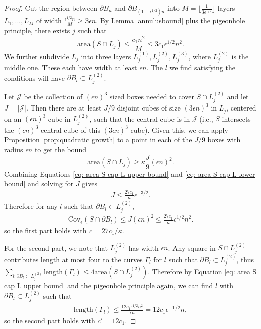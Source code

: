 \documentclass[11pt]{article}
\theoremstyle{remark}
\theoremstyle{definition}
\newcommand{\mc}[1]{\mathcal{#1}}
\begin{document}
\begin{proof}
    Cut the region between $\partial B_n$ and $\partial B_{(1-\epsilon^{1/2})n}$ into $M = \lfloor \frac{1}{3\epsilon^{1/2}}\rfloor$ layers $L_1,...,L_M$ of width $\frac{\epsilon^{1/2} n}{M}\geq 3\epsilon n$. By Lemma \ref{annulusbound} plus the pigeonhole principle, there exists $j$ such that 
    \begin{equation}\label{eq: area S cap L upper bound}
        \text{area}(S\cap L_j) \leq \frac{c_1 n^2}{M} \leq 3 c_1 \epsilon^{1/2} n^2.
    \end{equation}
    We further subdivide $L_j$ into three layers $L_j^{(1)},L_j^{(2)}, L_j^{(3)}$, where $L_j^{(2)}$ is the middle one. These each have width at least $\epsilon n$. The $l$ we find satisfying the conditions will have $\partial B_l \subset L_j^{(2)}$. 

    Let $\mc J$ be the collection of $(\epsilon n)^3$ sized boxes needed to cover $S\cap L_j^{(2)}$ and let $J = |\mc J|$. Then there are at least $J/9$ disjoint cubes of size $(3\epsilon n)^3$ in $L_j$, centered on an $(\epsilon n)^3$ cube in $L_j^{(2)}$, such that the central cube is in $\mc J$ (i.e., $S$ intersects the $(\epsilon n)^3$ central cube of this $(3\epsilon n)^3$ cube). Given this, we can apply Proposition \ref{prop:quadratic growth} to a point in each of the $J/9$ boxes with radius $\epsilon n$ to get the bound 
     \begin{equation}\label{eq: area S cap L lower bound}
        \text{area}(S\cap L_j) \geq \kappa \frac{J}{9} (\epsilon n)^2.
    \end{equation}
    Combining Equations \eqref{eq: area S cap L upper bound} and \eqref{eq: area S cap L lower bound} and solving for $J$ gives 
    \begin{align*}
        J \leq \frac{27 c_1}{\kappa} \epsilon^{-3/2}.
    \end{align*}
    Therefore for any $l$ such that $\partial B_l \subset L_j^{(2)}$, 
    \begin{align*}
        \text{Cov}_\epsilon(S\cap \partial B_l) \leq J (\epsilon n)^2 \leq \frac{27 c_1}{\kappa} \epsilon^{1/2} n^2.
    \end{align*}
    so the first part holds with $c = 27 c_1/\kappa$. 
        
    For the second part, we note that $L_j^{(2)}$ has width $\epsilon n$. Any square in $S\cap L_j^{(2)}$ contributes length at most four to the curves $\Gamma_l$ for $l$ such that $\partial B_l\subset L_j^{(2)}$, thus $\sum_{l: \partial B_l\subset L_j^{(2)}}\text{length}(\Gamma_l)\leq 4\text{area}(S\cap L_j^{(2)})$. Therefore by Equation \eqref{eq: area S cap L upper bound} and the pigeonhole principle again, we can find $l$ with $\partial B_l\subset L_j^{(2)}$ such that 
    \begin{align*}
        \text{length}(\Gamma_l) \leq \frac{12 c_1 \epsilon^{1/2} n^2}{\epsilon n} =  12 c_1 \epsilon^{-1/2} n,
    \end{align*}
    so the second part holds with $c' = 12 c_1$. 
\end{proof}
\end{document}
